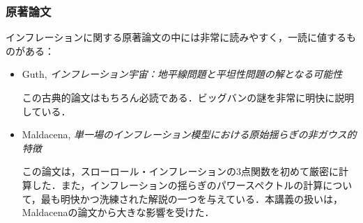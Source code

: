 \subsubsection*{原著論文}

インフレーションに関する原著論文の中には非常に読みやすく，一読に値するものがある：

\begin{itemize}
\item Guth, {\it インフレーション宇宙：地平線問題と平坦性問題の解となる可能性}

{\small この古典的論文はもちろん必読である．ビッグバンの謎を非常に明快に説明している．}

\item Maldacena, {\it 単一場のインフレーション模型における原始揺らぎの非ガウス的特徴}

{\small この論文は，スローロール・インフレーションの3点関数を初めて厳密に計算した．また，インフレーションの揺らぎのパワースペクトルの計算について，最も明快かつ洗練された解説の一つを与えている．本講義の扱いは，Maldacenaの論文から大きな影響を受けた．}


{\small }
\end{itemize}

\newpage
